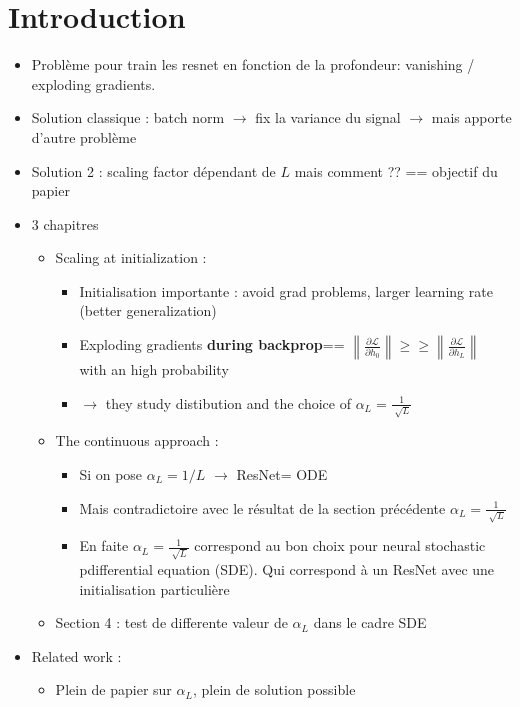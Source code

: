 \documentclass{article}
\theoremstyle{plain}%
\theoremstyle{definition}
\theoremstyle{remark}
\begin{document}
\section{Introduction}
\begin{itemize}
    \item Problème pour train les resnet en fonction de la profondeur: vanishing / exploding gradients.
    \item Solution classique : batch norm $\rightarrow$ fix la variance du signal $\rightarrow$ mais apporte d'autre problème
    \item Solution 2 : scaling factor dépendant de $ L $ mais comment ?? == objectif du papier
    \item 3 chapitres \begin{itemize}
        \item Scaling at initialization : \begin{itemize}
            \item Initialisation importante : avoid grad problems, larger learning rate (better generalization)
            \item Exploding gradients \textbf{during backprop}== $ \left\| \frac{\partial \mathcal{L}}{\partial h_0 }  \right\| \geq \geq \left\| \frac{\partial \mathcal{L}}{\partial h_L }  \right\|  $ with an high probability 
            \item $\rightarrow$ they study distibution and the choice of $ \alpha _L = \frac{1}{\sqrt[]{L}} $ 
        \end{itemize}
        \item The continuous approach : \begin{itemize}
            \item Si on pose $ \alpha _L = 1/L$  $\rightarrow$ ResNet= ODE
            \item Mais contradictoire avec le résultat de la section précédente $ \alpha _L = \frac{1}{\sqrt[]{L}} $ 
            \item En faite  $ \alpha _L = \frac{1}{\sqrt[]{L}} $ correspond au bon choix pour neural stochastic pdifferential equation (SDE). Qui correspond à un ResNet avec une initialisation particulière
        \end{itemize}
        \item Section 4 : test de differente valeur de $ \alpha _L $ dans le cadre SDE
    \end{itemize}
    \item Related work : \begin{itemize}
        \item Plein de papier sur $ \alpha _L $, plein de solution possible

\end{itemize}
\end{itemize}
\end{document}
